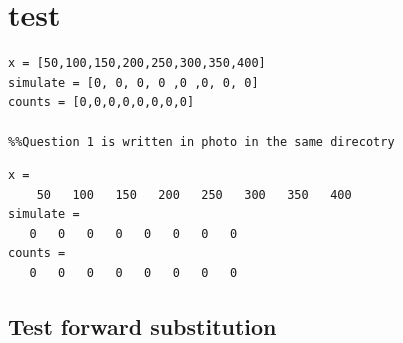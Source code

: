 \documentclass[10pt]{article}
\begin{document}
{\Huge\section*{test}}

\tableofcontents
\vspace*{4em}

\begin{lstlisting}
x = [50,100,150,200,250,300,350,400]
simulate = [0, 0, 0, 0 ,0 ,0, 0, 0]
counts = [0,0,0,0,0,0,0,0]

%%Question 1 is written in photo in the same direcotry
\end{lstlisting}
\begin{lstlisting}[language={},xleftmargin=5pt,frame=none]
x =
    50   100   150   200   250   300   350   400
simulate =
   0   0   0   0   0   0   0   0
counts =
   0   0   0   0   0   0   0   0

\end{lstlisting}


{}
\subsection*{Test forward substitution}
\end{document}
